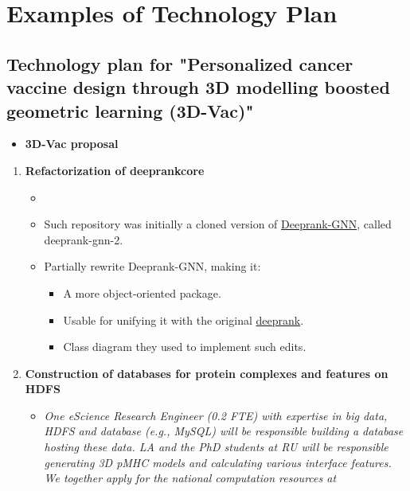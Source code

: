 \section{Examples of Technology Plan }
\label{app:exampleplan}

\subsection{Technology plan for "Personalized cancer vaccine design through 3D modelling boosted geometric learning (3D-Vac)"}

\bigskip

\begin{itemize}
\item \textbf{3D-Vac proposal}
\end{itemize}

\begin{enumerate}[start=0,leftmargin=.7in,label={\bfseries \ding{118} Task \arabic*:}]%
\item  \textbf{Refactorization of deeprankcore}
    \begin{itemize}[label=]
    \item {}
    \item Such repository was initially a cloned version of
    \href{https://github.com/DeepRank/Deeprank-GNN}{Deeprank-GNN}, called deeprank-gnn-2.
    \item Partially rewrite Deeprank-GNN, making it:
    \begin{itemize}
        \item A more object-oriented package.
        \item Usable for unifying it with the original \href{https://github.com/DeepRank/deeprank}{deeprank}.
        \item Class diagram they used to implement such edits.
        \end{itemize}
    \end{itemize}
\item \textbf{Construction of databases for protein complexes and features on HDFS}
    \begin{itemize}[label=]
        \item \textit{One eScience Research Engineer (0.2 FTE) with expertise in big data, HDFS and database (e.g., MySQL) will be
    responsible building a database hosting these data. LA and the PhD students at RU will be responsible generating 3D
    pMHC models and calculating various interface features. We together apply for the national computation resources at
}
\end{itemize}
\end{enumerate}
